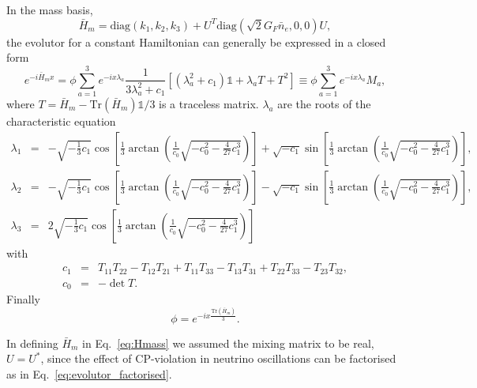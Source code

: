 \documentclass{article}
\begin{document}
In the mass basis,
\begin{equation}\label{eq:Hmass}
	\bar{H}_m = \text{diag}(k_1,k_2,k_3) + U^T \text{diag}(\sqrt{2}G_F \bar{n}_e, 0, 0) U,
\end{equation}
the evolutor for a constant Hamiltonian can generally be expressed in a closed form~\cite{Ohlsson:1999xb}
\begin{equation}
	e^{- i \bar{H}_m x} = \phi \sum_{a=1}^3 e^{-i x \lambda_a} \frac{1}{3\lambda_a^2 + c_1}\left[ \left(\lambda_a^2 + c_1\right) \mathbb{1} + \lambda_a T + T^2 \right] \equiv \phi \sum_{a=1}^3 e^{-i x \lambda_a} M_a,
\end{equation}
where $T = \bar{H}_m - \text{Tr}(\bar{H}_m) \mathbb{1}/3 $ is a traceless matrix. $\lambda_a$ are the roots of the characteristic equation
\begin{eqnarray}
\lambda_1 &=& - \sqrt{-\frac{1}{3} c_1} \cos \left[ \frac{1}{3}
\arctan \left( \frac{1}{c_0} \sqrt{-c_0^2 - \frac{4}{27} c_1^3}
\right) \right] + \sqrt{-c_1} \sin \left[ \frac{1}{3} \arctan \left(
\frac{1}{c_0} \sqrt{-c_0^2 - \frac{4}{27} c_1^3} \right) \right],\\
\lambda_2 &=& - \sqrt{-\frac{1}{3} c_1} \cos \left[ \frac{1}{3} \arctan
\left( \frac{1}{c_0} \sqrt{-c_0^2 - \frac{4}{27} c_1^3} \right)
\right] - \sqrt{-c_1} \sin \left[ \frac{1}{3} \arctan \left(
\frac{1}{c_0} \sqrt{-c_0^2 - \frac{4}{27} c_1^3} \right) \right], \\
\lambda_3 &=& 2 \sqrt{-\frac{1}{3} c_1} \cos \left[ \frac{1}{3} \arctan
\left( \frac{1}{c_0} \sqrt{-c_0^2 - \frac{4}{27} c_1^3} \right)
\right]
\end{eqnarray}
with
\begin{eqnarray}
	c_1 &=& T_{11} T_{22} - T_{12} T_{21} + T_{11} T_{33} - T_{13} T_{31}
+ T_{22} T_{33} - T_{23} T_{32}, \\
c_0 &=& - \det T.
\end{eqnarray}
Finally
\begin{equation}
	\phi = e^{- i x \frac{\text{Tr}(\bar{H}_m)}{3} }.
\end{equation}

In defining $\bar{H}_m$ in Eq.~\ref{eq:Hmass} we assumed the mixing matrix to be real, $U = U^*$, since the effect of CP-violation in neutrino oscillations can be factorised as in Eq.~\ref{eq:evolutor_factorised}.
\end{document}
